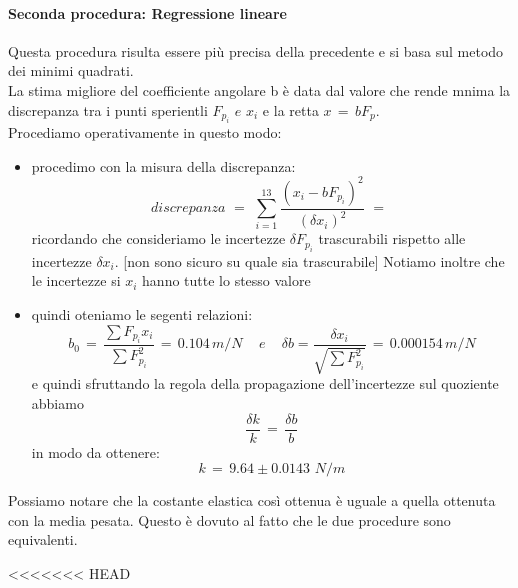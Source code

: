 \paragraph{Seconda procedura: Regressione lineare\\}
Questa procedura risulta essere più precisa della precedente e si basa sul metodo dei minimi quadrati.\\
La stima migliore del coefficiente angolare b è data dal valore che rende mnima la discrepanza tra i punti sperientli $F_{p_i} \,\,e\,\, x_i$ e la retta $x \,=\, bF_p$.\\
Procediamo operativamente in questo modo:
\begin{itemize}
	\item{procedimo con la misura della discrepanza:
			\begin{equation*}
				discrepanza \,\,=\,\, \sum_{i=1}^{13} \frac{(x_i - bF_{p_i})^2}{(\delta x_i)^2} \,\,=\,\,		
			\end{equation*}
			ricordando che consideriamo le incertezze $\delta F_{p_i}$ trascurabili rispetto alle incertezze $\delta x_i$. [non sono sicuro su quale sia trascurabile] Notiamo inoltre che le incertezze si $x_i$ hanno tutte lo stesso valore}
	\item{quindi oteniamo le segenti relazioni:
			\begin{equation*}
				b_0  \,=\,  \frac{\sum F_{p_i}  x_i}{\sum F_{p_i}^2} \,=\, 0.104 \, m/N \,\,\,\,\,\,\, e \,\,\,\,\,\,\,
				\delta b  =  \frac{\delta x_i}{\sqrt{\sum F_{p_i}^2}} \,=\, 0.000154 \, m/N
			\end{equation*}
			e quindi sfruttando la regola della propagazione dell'incertezze sul quoziente abbiamo
			\begin{equation*}
				\frac{\delta k}{k} \,=\, \frac{\delta b}{b}
			\end{equation*}
			in modo da ottenere:
			\begin{equation*}
				k \,=\, 9.64 \pm 0.0143 \,\,N/m
			\end{equation*}
			}
\end{itemize}
Possiamo notare che la costante elastica così ottenua è uguale a quella ottenuta con la media pesata. Questo è dovuto al fatto che le due procedure sono equivalenti.

<<<<<<< HEAD
